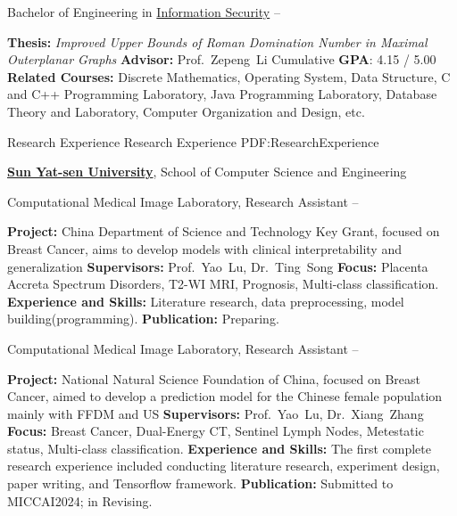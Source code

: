 \documentclass[a4paper,MMMyyyy,nonstopmode]{simpleresumecv}
\begin{document}
\begin{Body}
\Gap
Bachelor of Engineering in 
\href{https://xxxy.lzu.edu.cn/}
{Information Security}
\hfill
{} --
\begin{Detail}
    \BulletItem
    \textbf{Thesis:}
    \emph{Improved Upper Bounds of Roman Domination Number in Maximal Outerplanar Graphs}
    \BulletItem
    \textbf{Advisor:}
    Prof.~Zepeng~Li
    \BulletItem
    Cumulative \textbf{GPA}: 4.15 / 5.00
    \BulletItem
    \textbf{Related Courses:}
    Discrete Mathematics, Operating System, Data Structure, C and C++ Programming Laboratory, 
    Java Programming Laboratory, Database Theory and Laboratory, Computer Organization and Design, etc.
\end{Detail}


\Section
{{\large Research Experience}}
{{\large Research Experience}}
{PDF:ResearchExperience}

\Entry
\href{https://www.sysu.edu.cn/}
{\textbf{Sun Yat-sen University}},
School of Computer Science and Engineering

\Gap
\BulletItem
Computational Medical Image Laboratory, Research Assistant
\hfill
{} --
\begin{Detail}
\SubBulletItem
\textbf{Project:}
China Department of Science and Technology Key Grant, focused on Breast Cancer, 
aims to develop models with clinical interpretability and generalization
\SubBulletItem
\textbf{Supervisors:}
Prof.~Yao~Lu, 
Dr.~Ting~Song
\SubBulletItem
\textbf{Focus:}
Placenta Accreta Spectrum Disorders, T2-WI MRI, Prognosis, Multi-class classification.
\SubBulletItem
\textbf{Experience and Skills:}
Literature research, data preprocessing, model building(programming).
\SubBulletItem
\textbf{Publication:}
Preparing.
\end{Detail}

\BigGap
\BulletItem
Computational Medical Image Laboratory, Research Assistant
\hfill
{} --
\begin{Detail}
\SubBulletItem
\textbf{Project:}
National Natural Science Foundation of China, 
focused on Breast Cancer, 
aimed to develop a prediction model for the Chinese female population mainly with FFDM and US
\SubBulletItem
\textbf{Supervisors:}
Prof.~Yao~Lu, 
Dr.~Xiang~Zhang
\SubBulletItem
\textbf{Focus:}
Breast Cancer, Dual-Energy CT, Sentinel Lymph Nodes, Metestatic status, Multi-class classification.
\SubBulletItem
\textbf{Experience and Skills:}
The first complete research experience included conducting literature research, 
experiment design, paper writing, and Tensorflow framework.
\SubBulletItem
\textbf{Publication:}
Submitted to MICCAI2024; in Revising.
\end{Detail}


\end{Body}
\end{document}
